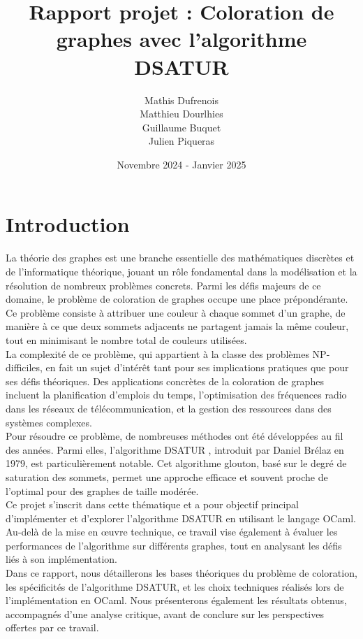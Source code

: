 \documentclass[11pt]{article}
\title{Rapport projet : Coloration de graphes avec l'algorithme DSATUR}
\author{Mathis Dufrenois \\ Matthieu Dourlhies \\ Guillaume Buquet \\ Julien Piqueras}
\date{Novembre 2024 - Janvier 2025}
\begin{document}
\maketitle
\newpage

\tableofcontents %
\newpage

\section{Introduction}

La théorie des graphes est une branche essentielle des mathématiques discrètes et de l'informatique théorique, jouant un rôle fondamental dans la modélisation et la résolution de nombreux problèmes concrets. Parmi les défis majeurs de ce domaine, le problème de coloration de graphes occupe une place prépondérante. Ce problème consiste à attribuer une couleur à chaque sommet d’un graphe, de manière à ce que deux sommets adjacents ne partagent jamais la même couleur, tout en minimisant le nombre total de couleurs utilisées. \\

La complexité de ce problème, qui appartient à la classe des problèmes NP-difficiles, en fait un sujet d'intérêt tant pour ses implications pratiques que pour ses défis théoriques. Des applications concrètes de la coloration de graphes incluent la planification d'emplois du temps, l'optimisation des fréquences radio dans les réseaux de télécommunication, et la gestion des ressources dans des systèmes complexes. \\

Pour résoudre ce problème, de nombreuses méthodes ont été développées au fil des années. Parmi elles, l'algorithme DSATUR \cite{dsatur_wikipedia}, introduit par Daniel Brélaz \cite{brelaz1979} en 1979, est particulièrement notable. Cet algorithme glouton, basé sur le degré de saturation des sommets, permet une approche efficace et souvent proche de l'optimal pour des graphes de taille modérée. \\

Ce projet s'inscrit dans cette thématique et a pour objectif principal d'implémenter et d'explorer l'algorithme DSATUR en utilisant le langage OCaml. Au-delà de la mise en œuvre technique, ce travail vise également à évaluer les performances de l'algorithme sur différents graphes, tout en analysant les défis liés à son implémentation. \\

Dans ce rapport, nous détaillerons les bases théoriques du problème de coloration, les spécificités de l'algorithme DSATUR, et les choix techniques réalisés lors de l'implémentation en OCaml. Nous présenterons également les résultats obtenus, accompagnés d'une analyse critique, avant de conclure sur les perspectives offertes par ce travail.
\end{document}
